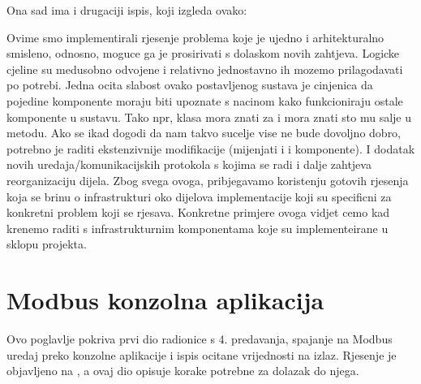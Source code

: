 \documentclass[letterpaper,10pt,croatian]{sphinxmanual}
\begin{document}
\begin{sphinxVerbatim}[commandchars=\\\{\}]
 


   
\end{sphinxVerbatim}

\sphinxAtStartPar
Ona sad ima i drugaciji ispis, koji izgleda ovako:

\noindent{}

\sphinxAtStartPar
Ovime smo implementirali rjesenje problema koje je ujedno i arhitekturalno
smisleno, odnosno, moguce ga je prosirivati s dolaskom novih zahtjeva. Logicke
cjeline su medusobno odvojene i relativno jednostavno ih mozemo prilagodavati
po potrebi. Jedna ocita slabost ovako postavljenog sustava je cinjenica da
pojedine komponente moraju biti upoznate s nacinom kako funkcioniraju ostale
komponente u sustavu. Tako npr,  klasa mora znati za
 i mora znati sto mu salje u  metodu. Ako se ikad
dogodi da nam takvo sucelje vise ne bude dovoljno dobro, potrebno je raditi
ekstenzivnije modifikacije (mijenjati i  i 
komponente). I dodatak novih uredaja/komunikacijskih protokola s kojima se radi
i dalje zahtjeva reorganizaciju  dijela. Zbog svega ovoga,
pribjegavamo koristenju gotovih rjesenja koja se brinu o infrastrukturi oko
dijelova implementacije koji su specificni za konkretni problem koji se
rjesava. Konkretne primjere ovoga vidjet cemo kad krenemo raditi s
infrastrukturnim komponentama koje su implementeirane u sklopu 
projekta.


\chapter{Modbus konzolna aplikacija}
\label{\detokenize{02-modbus-console/index:modbus-konzolna-aplikacija}}\label{\detokenize{02-modbus-console/index::doc}}
\sphinxAtStartPar
Ovo poglavlje pokriva prvi dio radionice s 4. predavanja, spajanje na Modbus
uredaj preko konzolne aplikacije i ispis ocitane vrijednosti na izlaz. Rjesenje
je objavljeno na , a ovaj dio opisuje korake
potrebne za dolazak do njega.
\end{document}
